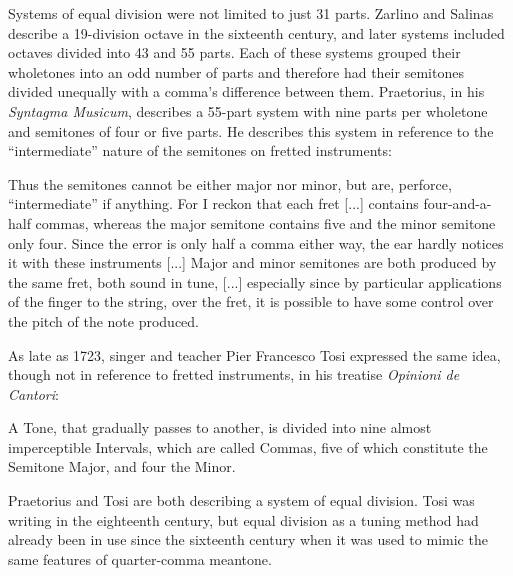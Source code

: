 Systems of equal division were not limited to just 31 parts. Zarlino and Salinas
describe a 19-division octave in the sixteenth century, and later systems included
octaves divided into 43 and 55 parts. Each of these systems grouped their wholetones
into an odd number of parts and therefore had their semitones divided unequally with a
comma's difference between them. Praetorius, in his \textit{Syntagma Musicum}, describes
a 55-part system with nine parts per wholetone and semitones of four or five parts. He
describes this system in reference to the ``intermediate'' nature of the semitones on
fretted instruments:
\begin{blocks}
Thus the semitones cannot be either major nor minor, but are, perforce, ``intermediate''
if anything. For I reckon that each fret [...] contains four-and-a-half commas, whereas
the major semitone contains five and the minor semitone only four. Since the error is
only half a comma either way, the ear hardly notices it with these instruments [...]
Major and minor semitones are both produced by the same fret, both sound in tune, [...]
especially since by particular applications of the finger to the string, over the fret,
it is possible to have some control over the pitch of the note produced.
\autocite[68]{MP:1}
\end{blocks}
As late as 1723, singer and teacher Pier Francesco Tosi expressed the same idea, though
not in reference to fretted instruments, in his treatise \textit{Opinioni de Cantori}:
\begin{blocks}
A Tone, that gradually passes to another, is divided into nine almost imperceptible
Intervals, which are called Commas, five of which constitute the Semitone Major, and four
the Minor.
\autocite[20]{PFT:1}
\end{blocks}
Praetorius and Tosi are both describing a system of equal division. Tosi was writing in
the eighteenth century, but equal division as a tuning method had already been in use
since the sixteenth century when it was used to mimic the same features of quarter-comma
meantone.


